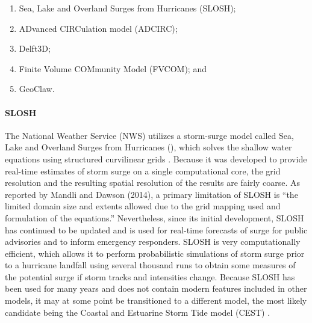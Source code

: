 \begin{enumerate}
    \item Sea, Lake and Overland Surges from Hurricanes  (SLOSH);
    \vspace{2mm}
    \item ADvanced CIRCulation model (ADCIRC);
        \vspace{2mm}
    \item Delft3D;
    \item Finite Volume COMmunity Model (FVCOM); and
        \vspace{2mm}
    \item GeoClaw.
\end{enumerate}

\paragraph{SLOSH} The National Weather Service (NWS) utilizes a storm-surge model called Sea, Lake and Overland Surges from Hurricanes (), which solves the shallow water equations using structured curvilinear grids \citep{jelesnianski1992NWS48}. Because it was developed to provide real-time estimates of storm surge on a single computational core, the grid resolution and the resulting spatial resolution of the results are fairly coarse. As reported by Mandli and Dawson (2014), a primary limitation of SLOSH is ``the limited domain size and extents allowed due to the grid mapping used and formulation of the equations.'' Nevertheless, since its initial development, SLOSH has continued to be updated and is used for real-time forecasts of surge for public advisories and to inform emergency responders. SLOSH is very computationally efficient, which allows it to perform probabilistic simulations of storm surge prior to a hurricane landfall using several thousand runs to obtain some measures of the potential surge if storm tracks and intensities change. Because SLOSH has been used for many years and does not contain modern features included in other models, it may at some point be transitioned to a different model, the most likely candidate being the Coastal and Estuarine Storm Tide model (CEST) \citep{zhang2017transition}. 

